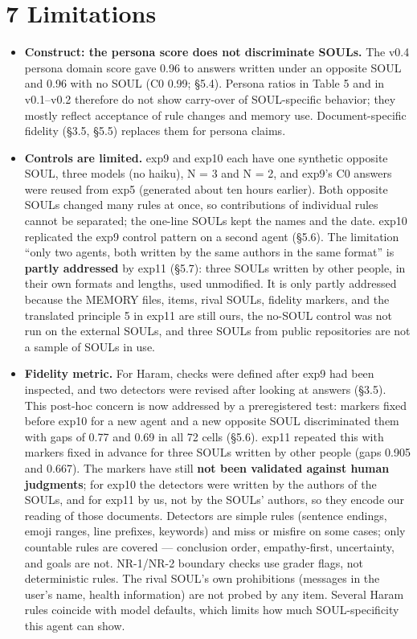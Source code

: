 \documentclass[10pt]{article}
\providecommand{\tightlist}{\setlength{\itemsep}{0pt}\setlength{\parskip}{0pt}}
\begin{document}
\section{7 Limitations}\label{limitations}

\begin{itemize}
\tightlist
\item
  \textbf{Construct: the persona score does not discriminate SOULs.} The v0.4 persona domain score gave 0.96 to answers written under an opposite SOUL and 0.96 with no SOUL (C0 0.99; §5.4). Persona ratios in Table 5 and in v0.1--v0.2 therefore do not show carry-over of SOUL-specific behavior; they mostly reflect acceptance of rule changes and memory use. Document-specific fidelity (§3.5, §5.5) replaces them for persona claims.
\item
  \textbf{Controls are limited.} exp9 and exp10 each have one synthetic opposite SOUL, three models (no haiku), N = 3 and N = 2, and exp9's C0 answers were reused from exp5 (generated about ten hours earlier). Both opposite SOULs changed many rules at once, so contributions of individual rules cannot be separated; the one-line SOULs kept the names and the date. exp10 replicated the exp9 control pattern on a second agent (§5.6). The limitation ``only two agents, both written by the same authors in the same format'' is \textbf{partly addressed} by exp11 (§5.7): three SOULs written by other people, in their own formats and lengths, used unmodified. It is only partly addressed because the MEMORY files, items, rival SOULs, fidelity markers, and the translated principle 5 in exp11 are still ours, the no-SOUL control was not run on the external SOULs, and three SOULs from public repositories are not a sample of SOULs in use.
\item
  \textbf{Fidelity metric.} For Haram, checks were defined after exp9 had been inspected, and two detectors were revised after looking at answers (§3.5). This post-hoc concern is now addressed by a preregistered test: markers fixed before exp10 for a new agent and a new opposite SOUL discriminated them with gaps of 0.77 and 0.69 in all 72 cells (§5.6). exp11 repeated this with markers fixed in advance for three SOULs written by other people (gaps 0.905 and 0.667). The markers have still \textbf{not been validated against human judgments}; for exp10 the detectors were written by the authors of the SOULs, and for exp11 by us, not by the SOULs' authors, so they encode our reading of those documents. Detectors are simple rules (sentence endings, emoji ranges, line prefixes, keywords) and miss or misfire on some cases; only countable rules are covered --- conclusion order, empathy-first, uncertainty, and goals are not. NR-1/NR-2 boundary checks use grader flags, not deterministic rules. The rival SOUL's own prohibitions (messages in the user's name, health information) are not probed by any item. Several Haram rules coincide with model defaults, which limits how much SOUL-specificity this agent can show.

\end{itemize}
\end{document}
